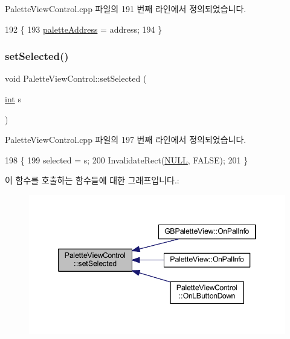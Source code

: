 Palette\+View\+Control.\+cpp 파일의 191 번째 라인에서 정의되었습니다.


\begin{DoxyCode}
192 \{
193   \mbox{\hyperlink{class_palette_view_control_a53b2efd4174e06a68e545608e458947b}{paletteAddress}} = address;
194 \}
\end{DoxyCode}
\mbox{\label{class_palette_view_control_afe3570f3d0bf905f25977346a50dec7f}} 
\subsubsection{\texorpdfstring{set\+Selected()}{setSelected()}}
{\footnotesize\ttfamily void Palette\+View\+Control\+::set\+Selected (\begin{DoxyParamCaption}\item[{\mbox{\hyperlink{_util_8cpp_a0ef32aa8672df19503a49fab2d0c8071}{int}}}]{s }\end{DoxyParamCaption})}



Palette\+View\+Control.\+cpp 파일의 197 번째 라인에서 정의되었습니다.


\begin{DoxyCode}
198 \{
199   selected = s;
200   InvalidateRect(\mbox{\hyperlink{getopt1_8c_a070d2ce7b6bb7e5c05602aa8c308d0c4}{NULL}}, FALSE);
201 \}
\end{DoxyCode}
이 함수를 호출하는 함수들에 대한 그래프입니다.\+:
\nopagebreak
\begin{figure}[H]
\begin{center}
\leavevmode
\includegraphics[width=346pt]{class_palette_view_control_afe3570f3d0bf905f25977346a50dec7f_icgraph}
\end{center}
\end{figure}
\mbox{\label{class_palette_view_control_a12772d59f8e890a920cb200d2f6a4b7a}} 
